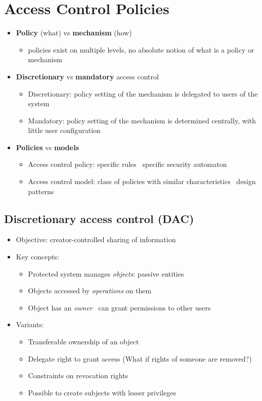 \documentclass[12pt,titlepage,a4paper]{report}
\begin{document}
	\section{Access Control Policies}
	\begin{itemize}
		\item \textbf{Policy} (what) vs \textbf{mechanism} (how)
		\begin{itemize}
			\item policies exist on multiple levels, no absolute notion of what is a policy or mechanism
		\end{itemize}
		\item \textbf{Discretionary} vs \textbf{mandatory} access control
		\begin{itemize}
			\item Discretionary: policy setting of the mechanism is delegated to users of the system
			\item Mandatory: policy setting of the mechanism is determined centrally, with little user configuration
		\end{itemize}
		\item \textbf{Policies} vs \textbf{models}
		\begin{itemize}
			\item Access control policy: specific rules \textrightarrow \, specific security automaton
			\item Access control model: class of policies with similar characteristics \textrightarrow \, design patterns
		\end{itemize}
	\end{itemize}

	\subsection{Discretionary access control (DAC)}
	\begin{itemize}
		\item Objective: creator-controlled sharing of information
		\item Key concepts:
		\begin{itemize}
			\item Protected system manages \textit{objects}: passive entities
			\item Objects accessed by \textit{operations} on them
			\item Object has an \textit{owner} \textrightarrow \, can grant permissions to other users
		\end{itemize}
		\item Variants:
		\begin{itemize}
			\item Transferable ownership of an object
			\item Delegate right to grant access (What if rights of someone are removed?)
			\item Constraints on revocation rights
			\item Possible to create subjects with lesser privileges
		\end{itemize}
	\end{itemize}
\end{document}

